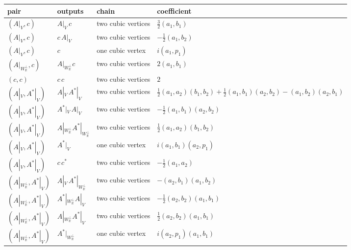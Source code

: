 \begin{tabular}{l|l|l|l}
pair & outputs & chain & coefficient \\
\hline
$(A|_V,c)$ & $A|_V\,c$ & two cubic vertices & $\tfrac32(a_1,b_1)$ \\
$(A|_V,c)$ & $c\,A|_V$ & two cubic vertices & $-\tfrac12(a_1,b_2)$ \\
$(A|_V,c)$ & $c$ & one cubic vertex & $i(a_1,p_1)$ \\
$(A|_{W_{\mathbb R}^\perp},c)$ & $A|_{W_{\mathbb R}^\perp}c$ & two cubic vertices & $2(a_1,b_1)$ \\
$(c,c)$ & $c\,c$ & two cubic vertices & $2$ \\
$(A|_V,A^*|_V)$ & $A|_V\,A^*|_V$ & two cubic vertices & $\tfrac12(a_1,a_2)(b_1,b_2)+\tfrac12(a_1,b_1)(a_2,b_2)-(a_1,b_2)(a_2,b_1)$ \\
$(A|_V,A^*|_V)$ & $A^*|_V\,A|_V$ & two cubic vertices & $-\tfrac12(a_1,b_1)(a_2,b_2)$ \\
$(A|_V,A^*|_V)$ & $A|_{W_{\mathbb R}^\perp}A^*|_{W_{\mathbb R}^\perp}$ & two cubic vertices & $\tfrac12(a_1,a_2)(b_1,b_2)$ \\
$(A|_V,A^*|_V)$ & $A^*|_V$ & one cubic vertex & $i(a_1,b_1)(a_2,p_1)$ \\
$(A|_V,A^*|_V)$ & $c\,c^*$ & two cubic vertices & $-\tfrac12(a_1,a_2)$ \\
$(A|_{W_{\mathbb R}^\perp},A^*|_V)$ & $A|_V\,A^*|_{W_{\mathbb R}^\perp}$ & two cubic vertices & $-(a_2,b_1)(a_1,b_2)$ \\
$(A|_{W_{\mathbb R}^\perp},A^*|_V)$ & $A^*|_{W_{\mathbb R}^\perp}A|_V$ & two cubic vertices & $-\tfrac12(a_2,b_2)(a_1,b_1)$ \\
$(A|_{W_{\mathbb R}^\perp},A^*|_V)$ & $A|_{W_{\mathbb R}^\perp}A^*|_V$ & two cubic vertices & $\tfrac12(a_2,b_2)(a_1,b_1)$ \\
$(A|_{W_{\mathbb R}^\perp},A^*|_V)$ & $A^*|_{W_{\mathbb R}^\perp}$ & one cubic vertex & $i(a_2,p_1)(a_1,b_1)$ \\
\end{tabular}

